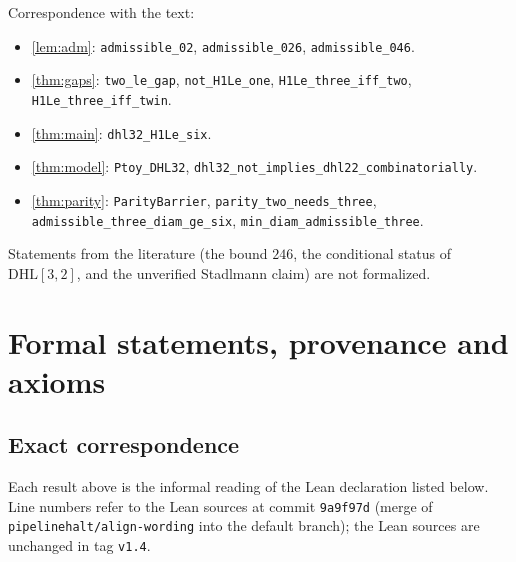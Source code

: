 \documentclass[11pt]{amsart}
\theoremstyle{plain}
\theoremstyle{definition}
\theoremstyle{remark}
\newcommand{\DHL}{\mathrm{DHL}}
\begin{document}
{\raggedright
\noindent Correspondence with the text:
\begin{itemize}
\item \cref{lem:adm}: \texttt{admissible\_02}, \texttt{admissible\_026}, \texttt{admissible\_046}.
\item \cref{thm:gaps}: \texttt{two\_le\_gap}, \texttt{not\_H1Le\_one}, \texttt{H1Le\_three\_iff\_two}, \texttt{H1Le\_three\_iff\_twin}.
\item \cref{thm:main}: \texttt{dhl32\_H1Le\_six}.
\item \cref{thm:model}: \texttt{Ptoy\_DHL32}, \texttt{dhl32\_not\_implies\_dhl22\_combinatorially}.
\item \cref{thm:parity}: \texttt{ParityBarrier}, \texttt{parity\_two\_needs\_three}, \texttt{admissible\_three\_diam\_ge\_six}, \texttt{min\_diam\_admissible\_three}.
\end{itemize}\par}
Statements from the literature (the bound $246$, the conditional status of $\DHL[3,2]$, and the unverified Stadlmann claim) are not formalized.

\section{Formal statements, provenance and axioms}\label{sec:formal}

\subsection*{Exact correspondence}
Each result above is the informal reading of the Lean declaration listed below. Line numbers refer to the Lean sources at commit \texttt{9a9f97d} (merge of \texttt{pipelinehalt/align-wording} into the default branch); the Lean sources are unchanged in tag \texttt{v1.4}.
\end{document}
